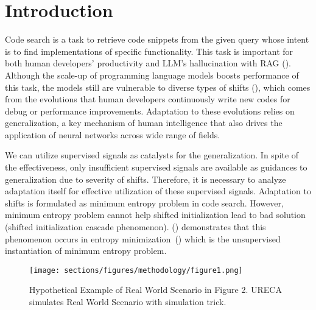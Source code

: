 
\section{Introduction}
\label{sec:intro}

Code search is a task to retrieve code snippets from the given query whose intent is to find implementations of specific functionality. 
This task is important for both human developers' productivity and LLM's hallucination with RAG 
(\cite{BrownBNMJPA20, LewisEAFVNHMWT20, LeiWWZHQWXBT25}). 
Although the scale-up of programming language models boosts performance of this task, 
the models still are vulnerable to diverse types of shifts (\cite{ArakelyanDMR23}), 
which comes from the evolutions that human developers continuously write new codes for debug or performance improvements.
Adaptation to these evolutions relies on generalization, 
a key mechanism of human intelligence that also drives the application of neural networks across wide range of fields.

We can utilize supervised signals as catalysts for the generalization. 
In spite of the effectiveness, 
only insufficient supervised signals are available as guidances to generalization
due to severity of shifts.
Therefore, it is necessary to analyze adaptation itself for effective utilization of these supervised signals.
Adaptation to shifts is formulated as minimum entropy problem in code search.
However, minimum entropy problem cannot help shifted initialization lead to bad solution (shifted initialization cascade phenomenon).
(\cite{OriRYM24}) demonstrates that this phenomenon occurs in entropy minimization~(\cite
{Yvew04}) 
which is the unsupervised instantiation of minimum entropy problem.

\begin{figure}[h]
\centering
\texttt{[image: sections/figures/methodology/figure1.png]} 
\caption{
Hypothetical Example of Real World Scenario in Figure 2.
URECA simulates Real World Scenario with simulation trick.
}
\label{fig1}
\end{figure}

